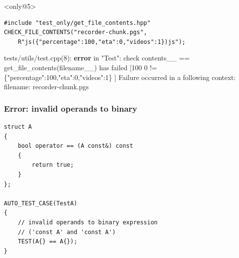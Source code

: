 \documentclass{beamer}
\begin{document}
\begin{frame}[fragile]
\begin{exampleblock}{}<only@5>
\begin{lstlisting}
#include "test_only/get_file_contents.hpp"
CHECK_FILE_CONTENTS("recorder-chunk.pgs",
    R"js({"percentage":100,"eta":0,"videos":1})js");
\end{lstlisting}
{\color{f7}tests/utils/test.cpp(8)}: \textbf{\color{f1}error} in "{\color{f5}Test}":
 {\color{f4}check contents\_\_ == get\_file\_contents(filename\_\_) has failed [100 0 != \{"percentage":100,"eta":0,"videos":1\} ]} \newline
Failure occurred in a following context: \newline
    filename: recorder-chunk.pgs
\end{exampleblock}
\end{frame}


\begin{frame}[fragile]
\frametitle{Error: invalid operands to binary}
\begin{lstlisting}
struct A
{
    bool operator == (A const&) const
    {
        return true;
    }
};

AUTO_TEST_CASE(TestA)
{
    // invalid operands to binary expression
    // ('const A' and 'const A')
    TEST(A{} == A{});
}
\end{lstlisting}
\end{frame}
\end{document}

